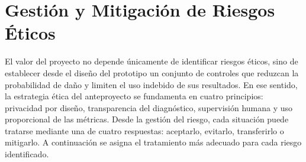 \section{Gestión y Mitigación de Riesgos Éticos}

El valor del proyecto no depende únicamente de identificar riesgos éticos, sino
de establecer desde el diseño del prototipo un conjunto de controles que reduzcan
la probabilidad de daño y limiten el uso indebido de sus resultados. En ese
sentido, la estrategia ética del anteproyecto se fundamenta en cuatro principios:
privacidad por diseño, transparencia del diagnóstico, supervisión humana y uso
proporcional de las métricas. Desde la gestión del riesgo, cada situación puede
tratarse mediante una de cuatro respuestas: aceptarlo, evitarlo, transferirlo o
mitigarlo. A continuación se asigna el tratamiento más adecuado para cada riesgo
identificado.

